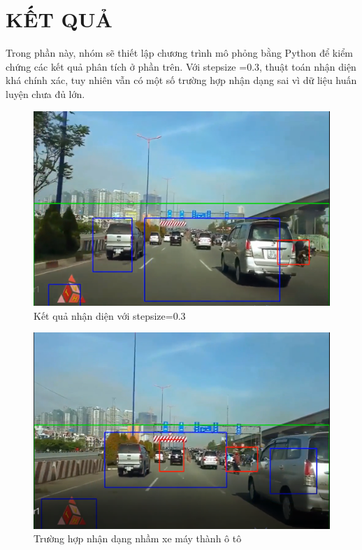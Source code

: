 \documentclass[10pt,conference,a4paper]{IEEEtran}
\makeatletter
\def\ScaleIfNeeded{\ifdim\Gin@nat@width>\linewidth\linewidth\else\Gin@nat@width\fi}
\makeatother
\begin{document}
\section{KẾT QUẢ}
\label{Sec:KetQuaMoPhong}
%
Trong phần này, nhóm sẽ thiết lập chương trình mô phỏng bằng Python để kiểm chứng các kết quả phân tích ở phần trên. 
Với stepsize =0.3, thuật toán nhận diện khá chính xác, tuy nhiên vẫn có một số trường hợp nhận dạng sai vì dữ liệu huấn luyện chưa đủ lớn.

\begin{figure}[!h]
	\centering
	\includegraphics[width=\ScaleIfNeeded, height=0.3\linewidth]{ketqua1}
	\caption{Kết quả nhận diện với stepsize=0.3}
	\label{fig:ketqua1}
\end{figure}
\begin{figure}[h]
	\centering
	\includegraphics[width=1\linewidth, height=0.2\textheight]{ketqua2}
	\caption{Trường hợp nhận dạng nhầm xe máy thành ô tô}
	\label{fig:ketqua2}
\end{figure}
\end{document}
